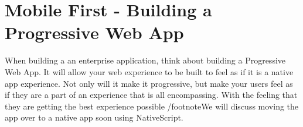 \maketitle{}
\section{ Mobile First - Building a Progressive Web App }

When building a an enterprise application, think about building a Progressive
Web App. It will allow your web experience to be built to feel as if it is a
native app experience. Not only will it make it progressive, but make your users
feel as if they are a part of an experience that is all encompassing. With the
feeling that they are getting the best experience possible /footnote{We will
discuss moving the app over to a native app soon using NativeScript.}
